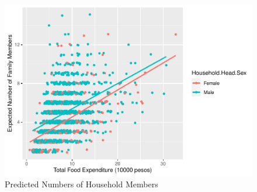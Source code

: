 \documentclass[
]{article}
\begin{document}
\begin{figure}[H]

{\centering \includegraphics[width=0.8\linewidth]{Group_01_Project2_demo_files/figure-latex/compare plot-1} 

}

\caption{Predicted Numbers of Household Members}\label{fig:compare plot}
\end{figure}
\end{document}
